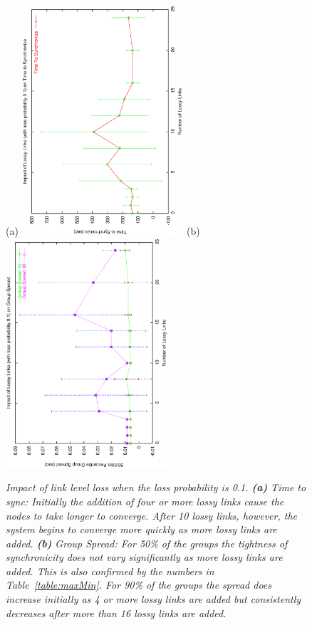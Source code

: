 \begin{figure}
\centerline{%
(a)
\includegraphics[width=6cm,angle=270]{figures/TTSvsLossyLinks0.1.ps}
(b)
\includegraphics[width=6cm,angle=270]{figures/GSvsLossyLinks0.1.ps}
}
\caption{{\it Impact of link level loss when the loss probability is 0.1. {\bf(a)} Time to sync: Initially the addition of four or more lossy links cause the nodes to take longer to converge.  After 10 lossy links, however, the system begins to converge more quickly as more lossy links are added. {\bf (b)} Group Spread: For 50\% of the groups the tightness of synchronicity does not vary significantly as more lossy links are added.  This is also confirmed by the numbers in Table~\ref{table:maxMin}.  For 90\% of the groups the spread does increase initially as 4 or more lossy links are added but consistently decreases after more than 16 lossy links are added.}}
\label{fig:linkloss0.1}
\end{figure}

